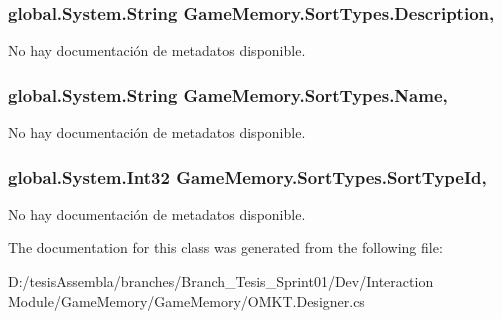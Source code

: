 \hypertarget{class_game_memory_1_1_sort_types_a1b9776a951d3683388021e927ca1a5fb}{
\subsubsection[{Description}]{\setlength{\rightskip}{0pt plus 5cm}global.\-System.\-String Game\-Memory.\-Sort\-Types.\-Description\hspace{0.3cm}{\ttfamily [get]}, {\ttfamily [set]}}}\label{class_game_memory_1_1_sort_types_a1b9776a951d3683388021e927ca1a5fb}


No hay documentación de metadatos disponible. 

\hypertarget{class_game_memory_1_1_sort_types_a41a4b183e89b71b60a52e58fba2d3c6f}{
\subsubsection[{Name}]{\setlength{\rightskip}{0pt plus 5cm}global.\-System.\-String Game\-Memory.\-Sort\-Types.\-Name\hspace{0.3cm}{\ttfamily [get]}, {\ttfamily [set]}}}\label{class_game_memory_1_1_sort_types_a41a4b183e89b71b60a52e58fba2d3c6f}


No hay documentación de metadatos disponible. 

\hypertarget{class_game_memory_1_1_sort_types_a49fac50b119c2c0286cfdbd9769dea4a}{
\subsubsection[{Sort\-Type\-Id}]{\setlength{\rightskip}{0pt plus 5cm}global.\-System.\-Int32 Game\-Memory.\-Sort\-Types.\-Sort\-Type\-Id\hspace{0.3cm}{\ttfamily [get]}, {\ttfamily [set]}}}\label{class_game_memory_1_1_sort_types_a49fac50b119c2c0286cfdbd9769dea4a}


No hay documentación de metadatos disponible. 



The documentation for this class was generated from the following file\-:\begin{DoxyCompactItemize}
\item 
D\-:/tesis\-Assembla/branches/\-Branch\-\_\-\-Tesis\-\_\-\-Sprint01/\-Dev/\-Interaction Module/\-Game\-Memory/\-Game\-Memory/O\-M\-K\-T.\-Designer.\-cs\end{DoxyCompactItemize}
